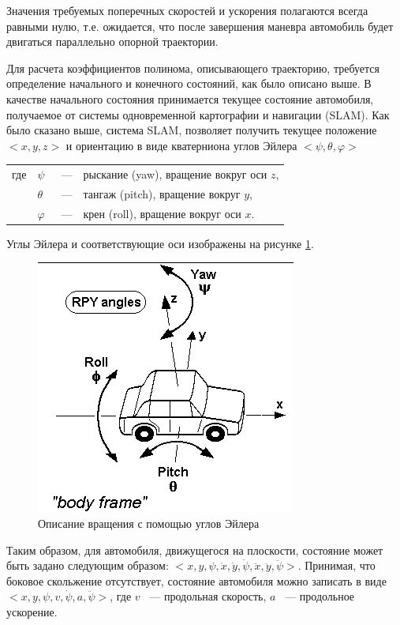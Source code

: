 Значения требуемых поперечных скоростей и ускорения полагаются всегда равными нулю, т.е. ожидается, что после завершения
маневра автомобиль будет двигаться параллельно опорной траектории.

Для расчета коэффициентов полинома, описывающего траекторию, требуется определение начального и конечного состояний, как
было описано выше. В качестве начального состояния принимается текущее состояние автомобиля, получаемое от системы
одновременной картографии и навигации (SLAM). Как было сказано выше, система SLAM, позволяет получить текущее положение
$<x, y, z>$ и ориентацию в виде кватерниона углов Эйлера $<\psi, \theta, \varphi>$
\noindent\begin{tabularx}{\linewidth}{lllX}
      где & $\psi$    &~---& рыскание (yaw), вращение вокруг оси $z$, \\
          & $\theta$  &~---& тангаж (pitch), вращение вокруг $y$, \\
          & $\varphi$ &~---& крен (roll), вращение вокруг оси $x$.
\end{tabularx}

Углы Эйлера и соответствующие оси изображены на рисунке \ref{img:euler_angles}.

\begin{figure}[h]
      \centering
      \includegraphics[width=0.5\linewidth]{images/euler_angles}
      \caption{Описание вращения с помощью углов Эйлера}
      \label{img:euler_angles}
\end{figure}

Таким образом, для автомобиля, движущегося на плоскости, состояние может быть задано следующим образом:
$<x, y, \psi, \dot{x}, \dot{y}, \dot{\psi}, \ddot{x}, \ddot{y}, \ddot{\psi}>$. Принимая, что боковое скольжение
отсутствует, состояние автомобиля можно записать в виде $<x, y, \psi, v, \dot{\psi}, a, \ddot{\psi}>$,
где $v$ ~--- продольная скорость, $a$ ~--- продольное ускорение.

